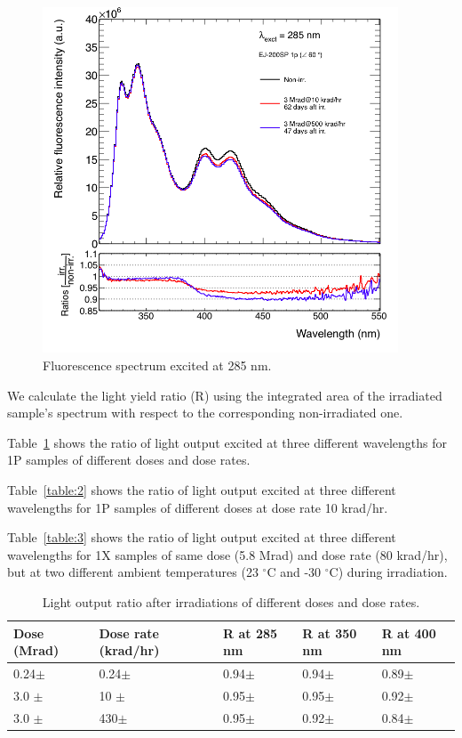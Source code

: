 \documentclass[preprint,12pt]{elsarticle}
\begin{document}
\begin{figure}[!h]
	\centering
	\includegraphics[width=300pt]{./figures/EJ200SP-1P-exc285.png}
	\caption{Fluorescence spectrum excited at 285 nm.}
	\label{fig:EJ200SP-1P-exc285}
\end{figure}

We calculate the light yield ratio (R) using the integrated area of the irradiated sample's spectrum 
with respect to the corresponding non-irradiated one. 

Table~\ref{table:1} shows the ratio of light output excited at three different wavelengths for 
1P {\color{red}{(1P1X?)}} samples of different doses and dose rates. 

Table~\ref{table:2} shows the ratio of light output excited at three different wavelengths for 
1P {\color{red}{(1P1X?)}} samples of different doses at dose rate 10 krad/hr. 

Table~\ref{table:3} shows the ratio of light output excited at three different wavelengths for 
1X {\color{red}{(1P1X?)}} samples of same dose (5.8 Mrad) and dose rate (80 krad/hr), 
but at two different ambient temperatures (23 $^\circ$C and -30 $^\circ$C) during irradiation. 

\begin{table}[!h]
\centering
  \caption{Light output ratio after irradiations of different doses and dose rates.}
  \begin{tabular}{l|l|l|l|l}
    \hline
    Dose (Mrad)  & Dose rate (krad/hr)& R at 285 nm	& R at 350 nm	& R at 400 nm    \\ \hline 
    0.24$\pm$    & 0.24$\pm$ 	      & 0.94$\pm$	& 0.94$\pm$	& 0.89$\pm$   \\ \hline
    3.0 $\pm$    & 10 $\pm$	      & 0.95$\pm$	& 0.95$\pm$	& 0.92$\pm$   \\ \hline
    3.0 $\pm$    & 430$\pm$	      & 0.95$\pm$	& 0.92$\pm$	& 0.84$\pm$   \\ 
    \hline
  \end{tabular}
  \label{table:1}
\end{table}
\end{document}
